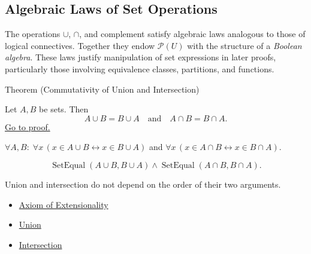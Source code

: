 
\subsection{Algebraic Laws of Set Operations}


\begin{remark*}[Exposition]
The operations $\cup$, $\cap$, and complement satisfy algebraic laws analogous
to those of logical connectives. Together they endow $\mathcal{P}(U)$ with
the structure of a \emph{Boolean algebra}. These laws justify manipulation
of set expressions in later proofs, particularly those involving equivalence
classes, partitions, and functions.
\end{remark*}

\begin{theorembox}{Theorem (Commutativity of Union and Intersection)}
\begin{theorem}\label{thm:commutativity}
Let $A,B$ be sets. Then
\[
A \cup B = B \cup A
\quad\text{and}\quad
A \cap B = B \cap A.
\]
\hyperref[prf:commutativity]{Go to proof.}
\end{theorem}
\end{theorembox}

\begin{remark*}
$\forall A, B:\; \forall x\,(x \in A \cup B \leftrightarrow x \in B \cup A)$ and $\forall x\,(x \in A \cap B \leftrightarrow x \in B \cap A)$.
\end{remark*}

\begin{remark*}
\[
  \operatorname{SetEqual}(A\cup B,B\cup A)
  \wedge
  \operatorname{SetEqual}(A\cap B,B\cap A).
\]
\end{remark*}

\begin{remark*}[Interpretation]
Union and intersection do not depend on the order of their two arguments.
\end{remark*}

\begin{dependencies}
\begin{itemize}
  \item \hyperref[ax:extensionality]{Axiom of Extensionality}
  \item \hyperref[def:union]{Union}
  \item \hyperref[def:intersection]{Intersection}
\end{itemize}
\end{dependencies}

